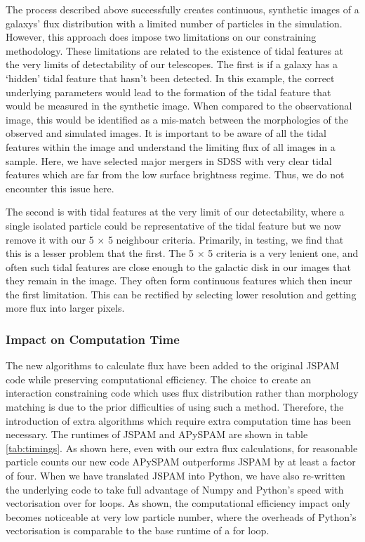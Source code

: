 The process described above successfully creates continuous, synthetic images of a galaxys' flux distribution with a limited number of particles in the simulation. However, this approach does impose two limitations on our constraining methodology. These limitations are related to the existence of tidal features at the very limits of detectability of our telescopes. The first is if a galaxy has a `hidden' tidal feature that hasn't been detected. In this example, the correct underlying parameters would lead to the formation of the tidal feature that would be measured in the synthetic image. When compared to the observational image, this would be identified as a mis-match between the morphologies of the observed and simulated images. It is important to be aware of all the tidal features within the image and understand the limiting flux of all images in a sample. Here, we have selected major mergers in SDSS with very clear tidal features which are far from the low surface brightness regime. Thus, we do not encounter this issue here.

The second is with tidal features at the very limit of our detectability, where a single isolated particle could be representative of the tidal feature but we now remove it with our 5 $\times$ 5 neighbour criteria. Primarily, in testing, we find that this is a lesser problem that the first. The 5 $\times$ 5 criteria is a very lenient one, and often such tidal features are close enough to the galactic disk in our images that they remain in the image. They often form continuous features which then incur the first limitation. This can be rectified by selecting lower resolution and getting more flux into larger pixels.

\subsubsection{Impact on Computation Time}
The new algorithms to calculate flux have been added to the original JSPAM code while preserving computational efficiency. The choice to create an interaction constraining code which uses flux distribution rather than morphology matching is due to the prior difficulties of using such a method. Therefore, the introduction of extra algorithms which require extra computation time has been necessary. The runtimes of JSPAM and APySPAM are shown in table \ref{tab:timings}. As shown here, even with our extra flux calculations, for reasonable particle counts our new code APySPAM outperforms JSPAM by at least a factor of four. When we have translated JSPAM into Python, we have also re-written the underlying code to take full advantage of Numpy and Python's speed with vectorisation over for loops.  As shown, the computational efficiency impact only becomes noticeable at very low particle number, where the overheads of Python's vectorisation is comparable to the base runtime of a for loop.

